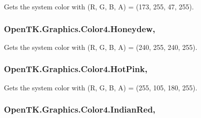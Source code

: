 Gets the system color with (R, G, B, A) = (173, 255, 47, 255). 

\hypertarget{struct_open_t_k_1_1_graphics_1_1_color4_a97b0fc5cc68c8dd25e0939e6a3cacd88}{
\subsubsection[{Honeydew}]{ Open\-T\-K.\-Graphics.\-Color4.\-Honeydew\hspace{0.3cm}{\ttfamily [static]}, {\ttfamily [get]}}}\label{struct_open_t_k_1_1_graphics_1_1_color4_a97b0fc5cc68c8dd25e0939e6a3cacd88}


Gets the system color with (R, G, B, A) = (240, 255, 240, 255). 

\hypertarget{struct_open_t_k_1_1_graphics_1_1_color4_a19466282837abebb6fdf0c01935cf34a}{
\subsubsection[{Hot\-Pink}]{ Open\-T\-K.\-Graphics.\-Color4.\-Hot\-Pink\hspace{0.3cm}{\ttfamily [static]}, {\ttfamily [get]}}}\label{struct_open_t_k_1_1_graphics_1_1_color4_a19466282837abebb6fdf0c01935cf34a}


Gets the system color with (R, G, B, A) = (255, 105, 180, 255). 

\hypertarget{struct_open_t_k_1_1_graphics_1_1_color4_ad01acd99183b4f512489304859408528}{
\subsubsection[{Indian\-Red}]{ Open\-T\-K.\-Graphics.\-Color4.\-Indian\-Red\hspace{0.3cm}{\ttfamily [static]}, {\ttfamily [get]}}}\label{struct_open_t_k_1_1_graphics_1_1_color4_ad01acd99183b4f512489304859408528}



